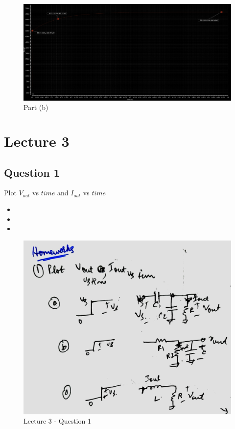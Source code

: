 \documentclass[a4paper]{article}
\begin{document}
\begin{figure}
    \centering
    \includegraphics[width=1\linewidth]{images/Lec_2_Q_2_b.png}
    \caption{Part (b)}
\end{figure}

\section{Lecture 3}
\subsection{Question 1}
Plot $V_{out}$ vs $time$ and $I_{out}$ vs $time$
\begin{itemize}
    \item 
    \item 
    \item 
\end{itemize}
\begin{figure}
    \centering
    \includegraphics[width=0.8\linewidth]{images/Lec_3_Q_1.jpeg}
    \caption{Lecture 3 - Question 1}
\end{figure}
\end{document}
